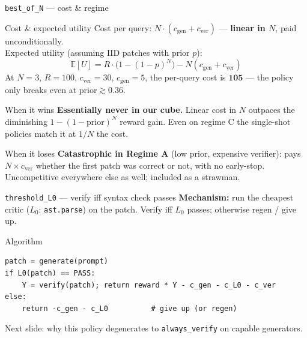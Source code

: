 \documentclass[10pt]{beamer}
\newcommand{\good}[1]{\textcolor{accentGreen}{\textbf{#1}}}
\newcommand{\bad}[1]{\textcolor{accentRed}{\textbf{#1}}}
\newcommand{\info}[1]{\textcolor{primaryBlue}{\textbf{#1}}}
\begin{document}
\begin{frame}[fragile]{\texttt{best\_of\_N} --- cost \& regime}
\begin{block}{Cost \& expected utility}
\footnotesize
Cost per query: $N \cdot (c_\text{gen} + c_\text{ver})$ --- \textbf{linear in
$N$}, paid unconditionally.\\[3pt]
Expected utility (assuming IID patches with prior $p$):
\[
\mathbb{E}[U] = R \cdot \bigl(1 - (1-p)^N\bigr) - N(c_\text{gen}+c_\text{ver})
\]
At $N{=}3$, $R{=}100$, $c_\text{ver}{=}30$, $c_\text{gen}{=}5$, the per-query
cost is $\mathbf{105}$ --- the policy only breaks even at
$\text{prior} \gtrsim 0.36$.
\end{block}

\begin{exampleblock}{When it wins}
\good{Essentially never in our cube.} Linear cost in $N$ outpaces the
diminishing $1-(1-\text{prior})^N$ reward gain. Even on regime C the
single-shot policies match it at $1/N$ the cost.
\end{exampleblock}

\begin{alertblock}{When it loses}
\bad{Catastrophic in Regime A} (low prior, expensive verifier): pays
$N\!\times\!c_\text{ver}$ whether the first patch was correct or not, with
no early-stop. Uncompetitive everywhere else as well; included as a
strawman.
\end{alertblock}
\end{frame}

\begin{frame}[fragile]{\texttt{threshold\_L0} --- verify iff syntax check passes}
\info{Mechanism:} run the cheapest critic ($L_0$: \texttt{ast.parse}) on
the patch. Verify iff $L_0$ passes; otherwise regen / give up.

\begin{block}{Algorithm}
\begin{lstlisting}
patch = generate(prompt)
if L0(patch) == PASS:
    Y = verify(patch); return reward * Y - c_gen - c_L0 - c_ver
else:
    return -c_gen - c_L0          # give up (or regen)
\end{lstlisting}
\end{block}

\textcolor{softGrey}{\scriptsize Next slide: why this policy degenerates
to \texttt{always\_verify} on capable generators.}
\end{frame}
\end{document}
